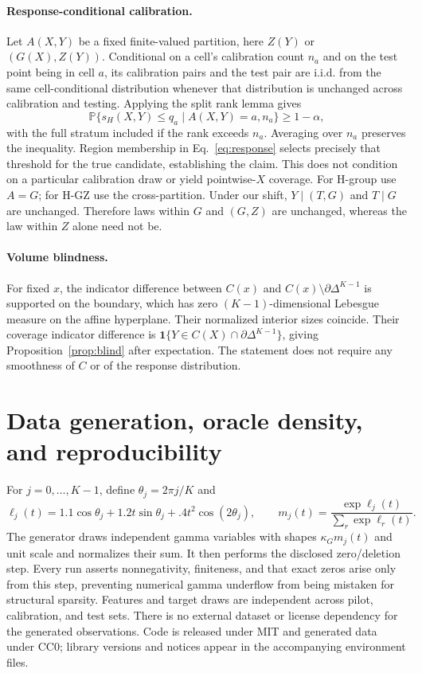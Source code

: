 \documentclass{article}
\newcommand{\D}{\Delta^{K-1}}
\newcommand{\Pp}{\mathbb P}
\newcommand{\ind}{\mathbf 1}
\begin{document}
\paragraph{Response-conditional calibration.}
Let $A(X,Y)$ be a fixed finite-valued partition, here $Z(Y)$ or $(G(X),Z(Y))$. Conditional on a cell's calibration count $n_a$ and on the test point being in cell $a$, its calibration pairs and the test pair are i.i.d. from the same cell-conditional distribution whenever that distribution is unchanged across calibration and testing. Applying the split rank lemma gives
\begin{equation}
 \Pp\{s_H(X,Y)\le q_a\mid A(X,Y)=a,n_a\}\ge1-\alpha,
\end{equation}
with the full stratum included if the rank exceeds $n_a$. Averaging over $n_a$ preserves the inequality. Region membership in Eq.~\eqref{eq:response} selects precisely that threshold for the true candidate, establishing the claim. This does not condition on a particular calibration draw or yield pointwise-$X$ coverage. For H-group use $A=G$; for H-GZ use the cross-partition. Under our shift, $Y\mid(T,G)$ and $T\mid G$ are unchanged. Therefore laws within $G$ and $(G,Z)$ are unchanged, whereas the law within $Z$ alone need not be.

\paragraph{Volume blindness.}
For fixed $x$, the indicator difference between $C(x)$ and $C(x)\setminus\partial\D$ is supported on the boundary, which has zero $(K-1)$-dimensional Lebesgue measure on the affine hyperplane. Their normalized interior sizes coincide. Their coverage indicator difference is $\ind\{Y\in C(X)\cap\partial\D\}$, giving Proposition~\ref{prop:blind} after expectation. The statement does not require any smoothness of $C$ or of the response distribution.

\section{Data generation, oracle density, and reproducibility}
\label{app:dgp}
For $j=0,\ldots,K-1$, define $\theta_j=2\pi j/K$ and
\begin{equation}
 \ell_j(t)=1.1\cos\theta_j+1.2t\sin\theta_j+.4t^2\cos(2\theta_j),\qquad
 m_j(t)=\frac{\exp\ell_j(t)}{\sum_r\exp\ell_r(t)}.
\end{equation}
The generator draws independent gamma variables with shapes $\kappa_G m_j(t)$ and unit scale and normalizes their sum. It then performs the disclosed zero/deletion step. Every run asserts nonnegativity, finiteness, and that exact zeros arise only from this step, preventing numerical gamma underflow from being mistaken for structural sparsity. Features and target draws are independent across pilot, calibration, and test sets. There is no external dataset or license dependency for the generated observations. Code is released under MIT and generated data under CC0; library versions and notices appear in the accompanying environment files.
\end{document}
